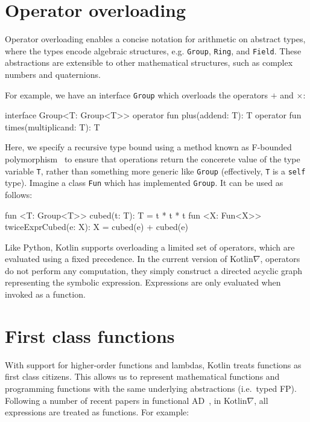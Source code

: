 \documentclass[12pt,initial,twoside,maitrise]{dms}
\def\inline{\lstinline[basicstyle=\ttfamily]}
\numberwithin{equation}{section}
\numberwithin{table}{chapter}
\numberwithin{figure}{chapter}
\begin{document}
\section{Operator overloading}\label{sec:operator-overloading}

\noindent Operator overloading enables a concise notation for arithmetic on abstract types, where the types encode algebraic structures, e.g. \inline{Group}, \inline{Ring}, and \inline{Field}. These abstractions are extensible to other mathematical structures, such as complex numbers and quaternions.

For example, we have an interface \inline{Group} which overloads the operators $+$ and $\times$:
%
\begin{mylisting}
interface Group<T: Group<T>> {
    operator fun plus(addend: T): T
    operator fun times(multiplicand: T): T
}
\end{mylisting}
%
Here, we specify a recursive type bound using a method known as F-bounded polymorphism~\citep{canning1989f} to ensure that operations return the concerete value of the type variable \inline{T}, rather than something more generic like \inline{Group} (effectively, \inline{T} is a \inline{self} type). Imagine a class \inline{Fun} which has implemented \inline{Group}. It can be used as follows:
%
\begin{mylisting}
fun <T: Group<T>> cubed(t: T): T = t * t * t
fun <X: Fun<X>> twiceExprCubed(e: X): X = cubed(e) + cubed(e)
\end{mylisting}
%
Like Python, Kotlin supports overloading a limited set of operators, which are evaluated using a fixed precedence. In the current version of Kotlin$\nabla$, operators do not perform any computation, they simply construct a directed acyclic graph representing the symbolic expression. Expressions are only evaluated when invoked as a function.

\section{First class functions}\label{sec:first-class-functions}

With support for higher-order functions and lambdas, Kotlin treats functions as first class citizens. This allows us to represent mathematical functions and programming functions with the same underlying abstractions (i.e.\ typed FP). Following a number of recent papers in functional AD~\citep{pearlmutter2008reverse,wang2018backpropagation}, in Kotlin$\nabla$, all expressions are treated as functions. For example:
\end{document}
